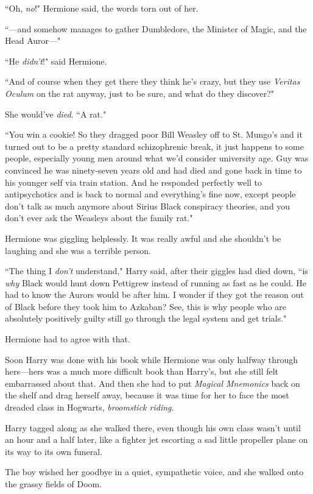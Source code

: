 ``Oh, \emph{no}!" Hermione said, the words torn out of her.

``---and somehow manages to gather Dumbledore, the Minister of Magic, and the Head Auror---"

``He \emph{didn't}!" said Hermione.

``And of course when they get there they think he's crazy, but they use \emph{Veritas Oculum} on the rat anyway, just to be sure, and what do they discover?"

She would've \emph{died}. ``A rat."

``You win a cookie! So they dragged poor Bill Weasley off to St. Mungo's and it turned out to be a pretty standard schizophrenic break, it just happens to some people, especially young men around what we'd consider university age. Guy was convinced he was ninety-seven years old and had died and gone back in time to his younger self via train station. And he responded perfectly well to antipsychotics and is back to normal and everything's fine now, except people don't talk as much anymore about Sirius Black conspiracy theories, and you don't ever ask the Weasleys about the family rat."

Hermione was giggling helplessly. It was really awful and she shouldn't be laughing and she was a terrible person.

``The thing I \emph{don't} understand," Harry said, after their giggles had died down, ``is \emph{why} Black would hunt down Pettigrew instead of running as fast as he could. He had to know the Aurors would be after him. I wonder if they got the reason out of Black before they took him to Azkaban? See, this is why people who are absolutely positively guilty still go through the legal system and get trials."

Hermione had to agree with that.

Soon Harry was done with his book while Hermione was only halfway through hers---hers was a much more difficult book than Harry's, but she still felt embarrassed about that. And then she had to put \emph{Magical Mnemonics} back on the shelf and drag herself away, because it was time for her to face the most dreaded class in Hogwarts, \emph{broomstick riding}.

Harry tagged along as she walked there, even though his own class wasn't until an hour and a half later, like a fighter jet escorting a sad little propeller plane on its way to its own funeral.

The boy wished her goodbye in a quiet, sympathetic voice, and she walked onto the grassy fields of Doom.


